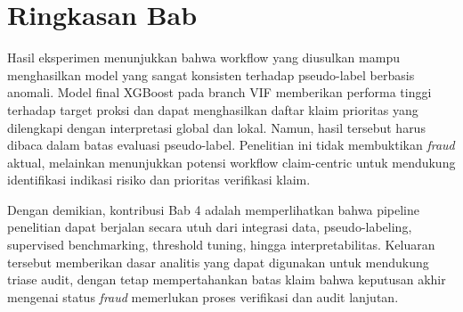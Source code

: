 \section{Ringkasan Bab}\label{ringkasan-bab4}

Hasil eksperimen menunjukkan bahwa workflow yang diusulkan mampu menghasilkan model yang sangat konsisten terhadap pseudo-label berbasis anomali. Model final XGBoost pada branch VIF memberikan performa tinggi terhadap target proksi dan dapat menghasilkan daftar klaim prioritas yang dilengkapi dengan interpretasi global dan lokal. Namun, hasil tersebut harus dibaca dalam batas evaluasi pseudo-label. Penelitian ini tidak membuktikan \emph{fraud} aktual, melainkan menunjukkan potensi workflow claim-centric untuk mendukung identifikasi indikasi risiko dan prioritas verifikasi klaim.

Dengan demikian, kontribusi Bab 4 adalah memperlihatkan bahwa pipeline penelitian dapat berjalan secara utuh dari integrasi data, pseudo-labeling, supervised benchmarking, threshold tuning, hingga interpretabilitas. Keluaran tersebut memberikan dasar analitis yang dapat digunakan untuk mendukung triase audit, dengan tetap mempertahankan batas klaim bahwa keputusan akhir mengenai status \emph{fraud} memerlukan proses verifikasi dan audit lanjutan.
